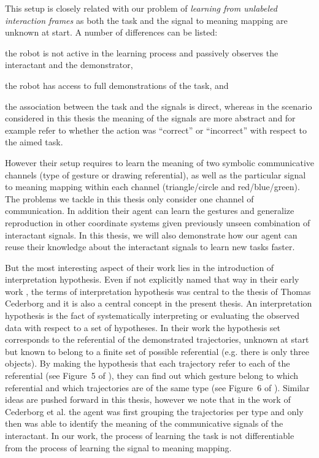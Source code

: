 This setup is closely related with our problem of \emph{learning from unlabeled interaction frames} as both the task and the signal to meaning mapping are unknown at start. A number of differences can be listed: \begin{inparaenum}[a)] \item the robot is not active in the learning process and passively observes the interactant and the demonstrator, \item  the robot has access to full demonstrations of the task, and \item the association between the task and the signals is direct, whereas in the scenario considered in this thesis the meaning of the signals are more abstract and for example refer to whether the action was ``correct'' or ``incorrect'' with respect to the aimed task. \end{inparaenum} However their setup requires to learn the meaning of two symbolic communicative channels (type of gesture or drawing referential), as well as the particular signal to meaning mapping within each channel (triangle/circle and red/blue/green). The problems we tackle in this thesis only consider one channel of communication. In addition their agent can learn the gestures and generalize reproduction in other coordinate systems given previously unseen combination of interactant signals. In this thesis, we will also demonstrate how our agent can reuse their knowledge about the interactant signals to learn new tasks faster.

But the most interesting aspect of their work lies in the introduction of interpretation hypothesis. Even if not explicitly named that way in their early work \cite{cederborg2011imitating}, the terms of interpretation hypothesis was central to the thesis of Thomas Cederborg \cite{cederborg2014thesis} and it is also a central concept in the present thesis. An interpretation hypothesis is the fact of systematically interpreting or evaluating the observed data with respect to a set of hypotheses. In their work the hypothesis set corresponds to the referential of the demonstrated trajectories, unknown at start but known to belong to a finite set of possible referential (e.g. there is only three objects). By making the hypothesis that each trajectory refer to each of the referential (see Figure~5 of \cite{cederborg2011imitating}), they can find out which gesture belong to which referential and which trajectories are of the same type (see Figure~6 of \cite{cederborg2011imitating}). Similar ideas are pushed forward in this thesis, however we note that in the work of Cederborg et al. the agent was first grouping the trajectories per type and only then was able to identify the meaning of the communicative signals of the interactant. In our work, the process of learning the task is not differentiable from the process of learning the signal to meaning mapping.

